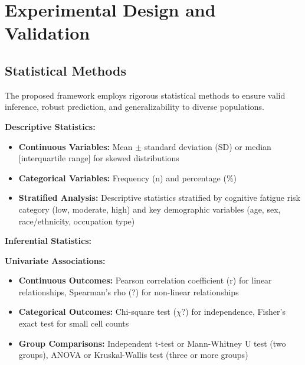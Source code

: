 \documentclass[journal,twoside,10pt]{IEEEtran}
\begin{document}
\section{Experimental Design and Validation}

\subsection{Statistical Methods}

The proposed framework employs rigorous statistical methods to ensure valid inference, robust prediction, and generalizability to diverse populations.

\textbf{Descriptive Statistics:}
\begin{itemize}
\item \textbf{Continuous Variables:} Mean $\pm$ standard deviation (SD) or median [interquartile range] for skewed distributions
\item \textbf{Categorical Variables:} Frequency (n) and percentage (\%)
\item \textbf{Stratified Analysis:} Descriptive statistics stratified by cognitive fatigue risk category (low, moderate, high) and key demographic variables (age, sex, race/ethnicity, occupation type)
\end{itemize}

\textbf{Inferential Statistics:}

\textbf{Univariate Associations:}
\begin{itemize}
\item \textbf{Continuous Outcomes:} Pearson correlation coefficient (r) for linear relationships, Spearman's rho (?) for non-linear relationships
\item \textbf{Categorical Outcomes:} Chi-square test ($\chi$?) for independence, Fisher's exact test for small cell counts
\item \textbf{Group Comparisons:} Independent t-test or Mann-Whitney U test (two groups), ANOVA or Kruskal-Wallis test (three or more groups)
\end{itemize}
\end{document}
